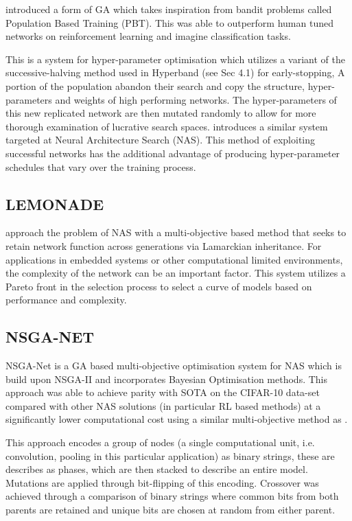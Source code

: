 \documentclass{article}
\begin{document}
\cite{39} introduced a form of GA which takes inspiration from bandit problems called Population Based Training (PBT). This was able to outperform human tuned networks on reinforcement learning and imagine classification tasks.
\par
This is a system for hyper-parameter optimisation which utilizes a variant of the  successive-halving\cite{45} method used in Hyperband (see Sec 4.1) for early-stopping, A portion of the population abandon their search and copy the structure, hyper-parameters and weights of high performing networks. The hyper-parameters of this new replicated network are then mutated randomly to allow for more thorough examination of lucrative search spaces. \cite{13} introduces a similar system targeted at Neural Architecture Search (NAS).
This method of exploiting successful networks has the additional advantage of producing hyper-parameter schedules that vary over the training process.

\subsection{LEMONADE}

\cite{13} approach the problem of NAS with a multi-objective based method that seeks to retain network function across generations via Lamarckian inheritance.
 For applications in embedded systems or other computational limited environments, the complexity of the network can be an important factor. This system utilizes a Pareto front in the selection process to select a curve of models based on performance and complexity. 
 
\subsection{NSGA-NET}

NSGA-Net \cite{5} is a GA based multi-objective optimisation system for NAS which is build upon NSGA-II\cite{42} and incorporates Bayesian Optimisation methods. This approach was able to achieve parity with SOTA on the CIFAR-10 data-set compared with other NAS solutions (in particular RL based methods) at a significantly lower computational cost using a similar multi-objective method as \cite{13}.

This approach encodes a group of nodes (a single computational unit, i.e. convolution, pooling in this particular application) as binary strings, these are describes as phases, which are then stacked to describe an entire model. Mutations are applied through bit-flipping of this encoding. Crossover was achieved through a comparison of binary strings where common bits from both parents are retained and unique bits are chosen at random from either parent.
\end{document}
